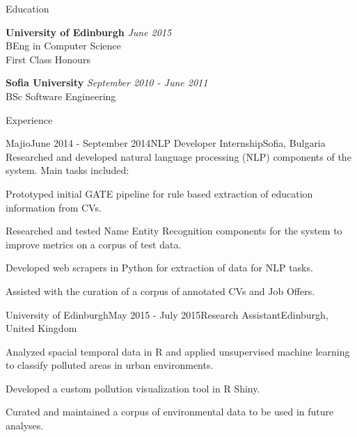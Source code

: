\documentclass{resume} %
\begin{document}

\begin{rSection}{Education}

{\bf University of Edinburgh} \hfill {\em June 2015} \\ 
BEng in Computer Science \\
First Class Honours

{\bf Sofia University} \hfill {\em September 2010 - June 2011} \\ 
BSc Software Engineering \\

\end{rSection}

\begin{rSection}{Experience}

\begin{rSubsection}{Majio}{June 2014 - September 2014}{NLP Developer Internship}{Sofia, Bulgaria}
Researched and developed natural language processing (NLP) components of the system. Main tasks included: 
\item Prototyped initial GATE pipeline for rule based extraction of education information from CVs.
\item Researched and tested Name Entity Recognition components for the system to improve metrics on a corpus of test data.
\item Developed web scrapers in Python for extraction of data for NLP tasks.
\item Assisted with the curation of a corpus of annotated CVs and Job Offers.
\end{rSubsection}

\begin{rSubsection}{University of Edinburgh}{May 2015 - July 2015}{Research Assistant}{Edinburgh, United Kingdom}
\item Analyzed spacial temporal data in R and applied unsupervised machine learning to classify polluted areas in urban environments.
\item Developed a custom pollution visualization tool in R Shiny.
\item Curated and maintained a corpus of environmental data to be used in future analyses.
\end{rSubsection}

\end{rSection}
\end{document}

